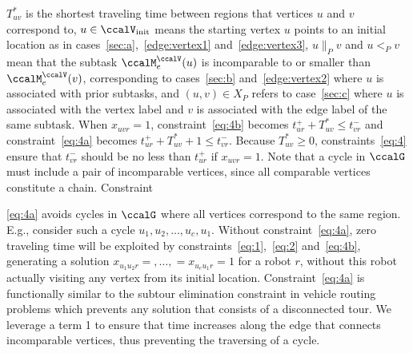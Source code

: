 \documentclass[Afour,sageh,times]{sagej}
\begin{document}
{{$T^*_{uv}$ is the shortest traveling time between regions that vertices $u$ and $v$ correspond to, $u \in \ccalV_{\text{init}}$ means the starting vertex $u$ points to an initial location as in cases~\ref{sec:a},~\ref{edge:vertex1} and~\ref{edge:vertex3}, $u \|_{P} v$ and $u<_{P} v$ mean that the subtask $\ccalM^\ccalV_{{e}}(u)$ is incomparable to or smaller than $\ccalM^\ccalV_e(v)$, corresponding to  cases~\ref{sec:b} and~\ref{edge:vertex2} where $u$ is associated with prior subtasks, and $(u,v)\in X_P$ refers to case~\ref{sec:c} where $u$ is associated with the vertex label and $v$ is associated with the edge label of the same subtask. When $x_{uvr}=1$, constraint~\eqref{eq:4b} becomes $t_{ur}^+  + T^*_{uv}  \leq t_{vr}^-$ and constraint~\eqref{eq:4a} becomes $t_{ur}^+  + T^*_{uv} + 1   \leq t_{vr}^-$. Because $T^*_{uv} \geq 0$, constraints~\eqref{eq:4} ensure that $t_{vr}^-$ should be no less than $t_{ur}^+$ if $x_{uvr}=1$. Note that a cycle in $\ccalG$ must include a pair of incomparable vertices, since all comparable vertices constitute a chain. Constraint~{\eqref{eq:4a} avoids cycles in $\ccalG$ where all vertices correspond to the same region. E.g., consider such a cycle $u_1,u_2,\ldots, u_c, u_1$. Without  constraint~\eqref{eq:4a}, zero traveling time will be exploited by constraints~\eqref{eq:1},~\eqref{eq:2} and~\eqref{eq:4b}, generating a solution $x_{u_1 u_2 r} = ,\ldots,=x_{u_c u_{1} r}= 1$ for a robot $r$, without this robot actually visiting any vertex from its initial location.  Constraint~\eqref{eq:4a} is functionally similar to the subtour elimination constraint in vehicle routing problems which prevents any solution that consists of a disconnected tour. We leverage a  term 1 to ensure that time increases along the edge that connects incomparable vertices, thus preventing the traversing of a cycle.

}}}
\end{document}
